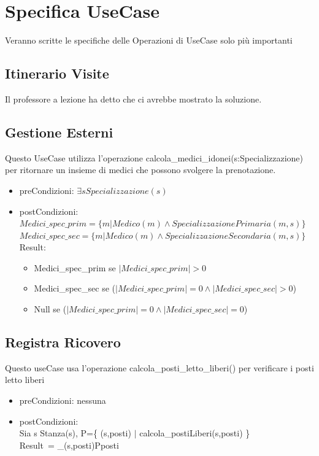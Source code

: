 \documentclass[12pt, letterpaper]{article}
\begin{document}
\section{Specifica UseCase}
Veranno scritte le specifiche delle Operazioni di UseCase solo più importanti
\subsection{Itinerario Visite}
Il professore a lezione ha detto che ci avrebbe mostrato la soluzione.
\subsection{Gestione Esterni}
Questo UseCase utilizza l'operazione calcola\_medici\_idonei(s:Specializzazione) per ritornare un insieme di medici che possono svolgere la prenotazione.
\begin{itemize}
    \item preCondizioni: $\exists s Specializzazione(s)$
    \item postCondizioni:\\
             $Medici\_spec\_prim=\{ m | Medico(m) \land SpecializzazionePrimaria(m,s) \}$ \\
             $Medici\_spec\_sec=\{ m | Medico(m) \land SpecializzazioneSecondaria(m,s) \}$\\
             Result: \begin{itemize}
                \item Medici\_spec\_prim se $|Medici\_spec\_prim|>0$
                \item Medici\_spec\_sec se ($|Medici\_spec\_prim|=0 \land |Medici\_spec\_sec|>0 $)
                \item Null se ($|Medici\_spec\_prim|=0 \land |Medici\_spec\_sec|=0 $)
             \end{itemize}
\end{itemize}


\subsection{Registra Ricovero}
Questo useCase usa l'operazione calcola\_posti\_letto\_liberi() per verificare i posti letto liberi 
\begin{itemize}
    \item preCondizioni: nessuna
    \item postCondizioni:\\
            Sia s Stanza(s), P=\{ (s,posti) $|$ calcola\_postiLiberi(s,posti) \}\\
            Result\ = \sum_{(s,posti)\in P}posti

\end{itemize}
\newpage
\end{document}
